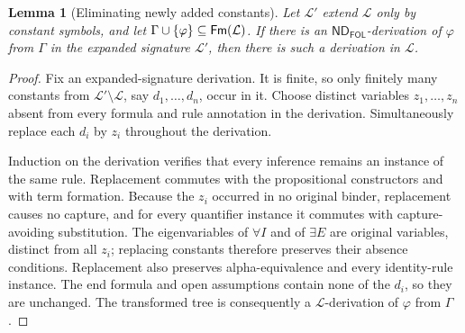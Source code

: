 \documentclass[11pt,oneside,openany]{book}
\theoremstyle{definition}
\theoremstyle{plain}
\newtheorem{lemma}[definition]{Lemma}
\theoremstyle{remark}
\DeclarePairedDelimiter{\set}{\lbrace}{\rbrace}
\newcommand{\Lang}{\mathcal{L}}
\newcommand{\Fm}{\mathsf{Fm}}
\newcommand{\ND}{\mathsf{ND}}
\newcommand{\FOL}{\mathsf{FOL}}
\begin{document}
\begin{lemma}[Eliminating newly added constants]
\label{lem:new-constant-elimination}
Let \(\Lang'\) extend \(\Lang\) only by constant symbols, and let
\(\Gamma\cup\set{\varphi}\subseteq\Fm(\Lang)\).  If there is an
\(\ND_{\FOL}\)-derivation of \(\varphi\) from \(\Gamma\) in the expanded
signature \(\Lang'\), then there is such a derivation in \(\Lang\).
\end{lemma}
\begin{proof}
Fix an expanded-signature derivation.  It is finite, so only finitely many
constants from \(\Lang'\setminus\Lang\), say
\(d_1,\ldots,d_n\), occur in it.  Choose distinct variables
\(z_1,\ldots,z_n\) absent from every formula and rule annotation in the
derivation.  Simultaneously replace each \(d_i\) by \(z_i\) throughout the
derivation.

Induction on the derivation verifies that every inference remains an instance
of the same rule.  Replacement commutes with the propositional constructors
and with term formation.  Because the \(z_i\) occurred in no original binder,
replacement causes no capture, and for every quantifier instance it commutes
with capture-avoiding substitution.  The eigenvariables of
\(\forall I\) and of \(\exists E\) are original variables,
distinct from all \(z_i\); replacing constants therefore preserves their
absence conditions.  Replacement also preserves alpha-equivalence and every
identity-rule instance.  The end formula and open assumptions contain none of
the \(d_i\), so they are unchanged.  The transformed tree is consequently a
\(\Lang\)-derivation of \(\varphi\) from \(\Gamma\).
\end{proof}
\end{document}
